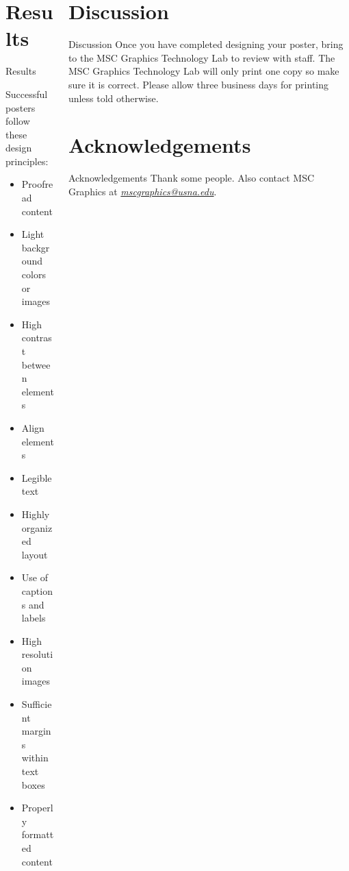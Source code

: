 \documentclass[pdf]{beamer}
\begin{document}
\begin{frame}{}
\begin{columns}[T,totalwidth=\textwidth]
\begin{column}{9.5in}
\begin{minipage}[t][\textheight]{\linewidth}
\section{Results}
\begin{block}{Results}
\begin{center}
\begin{minipage}{0.8\linewidth}
\begin{exampleblock}{}
Successful posters follow these design principles:
\begin{itemize}
\item Proofread content
\item Light background colors or images
\item High contrast between elements
\item Align elements
\item Legible text
\item Highly organized layout
\item Use of captions and labels
\item High resolution images
\item Sufficient margins within text boxes
\item Properly formatted content
\end{itemize}
\end{exampleblock}
\end{minipage}
\end{center}
\vspace*{12in}
\end{block}
\end{minipage}
\end{column}


\begin{column}{9.5in}%
\begin{minipage}[t][\textheight]{\linewidth}
\section{Discussion}
\begin{block}{Discussion}
Once you have completed designing your poster, bring to the MSC Graphics Technology Lab to review with staff. The MSC Graphics Technology Lab will only print one copy so make sure it is correct. Please allow three business days for printing unless told otherwise.
\end{block}
\vfill

\section*{Acknowledgements}
\begin{block}{Acknowledgements}
Thank some people. Also contact MSC Graphics at \href{mailto://mscgraphics@usna.edu}{\emph{mscgraphics@usna.edu}}.
\end{block}
\vfill


\end{minipage}
\end{column}
\end{columns}
\end{frame}
\end{document}

